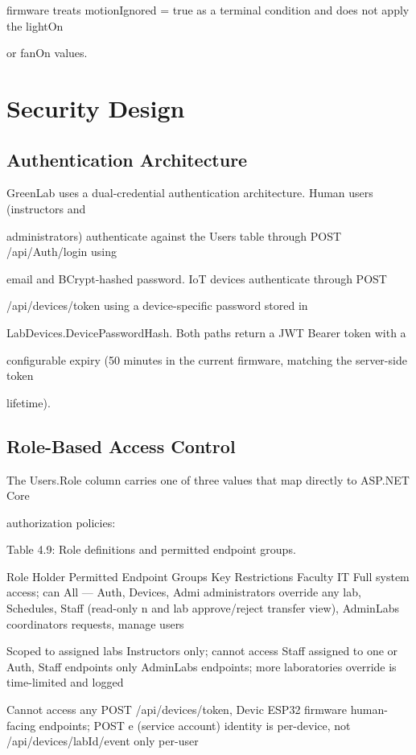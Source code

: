 firmware treats motionIgnored = true as a terminal condition and does not apply the
lightOn

or fanOn values.


\section{Security Design}


\subsection{Authentication Architecture}


GreenLab uses a dual-credential authentication architecture. Human users (instructors
and

administrators) authenticate against the Users table through POST /api/Auth/login using

email and BCrypt-hashed password. IoT devices authenticate through POST

/api/devices/token using a device-specific password stored in

LabDevices.DevicePasswordHash. Both paths return a JWT Bearer token with a

configurable expiry (50 minutes in the current firmware, matching the server-side token

lifetime).

\subsection{Role-Based Access Control}


The Users.Role column carries one of three values that map directly to ASP.NET Core

authorization policies:


Table 4.9: Role definitions and permitted endpoint groups.

Role Holder Permitted Endpoint Groups Key Restrictions
Faculty IT Full system access; can
All --- Auth, Devices,
Admi administrators override any lab,
Schedules, Staff (read-only
n and lab approve/reject transfer
view), AdminLabs
coordinators requests, manage users

Scoped to assigned labs
Instructors only; cannot access
Staff assigned to one or Auth, Staff endpoints only AdminLabs endpoints;
more laboratories override is time-limited
and logged

Cannot access any
POST /api/devices/token,
Devic ESP32 firmware human-facing endpoints;
POST
e (service account) identity is per-device, not
/api/devices/{labId}/event only
per-user


